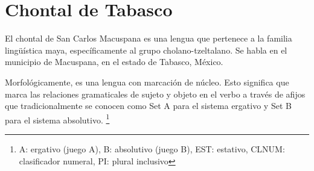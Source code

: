 \section*{Chontal de Tabasco}

\noindent El chontal de San Carlos Macuspana es una lengua que pertenece a la familia lingüística maya, específicamente al grupo cholano-tzeltalano. Se habla en el municipio de Macuspana, en el estado de Tabasco, México.

Morfológicamente, es una lengua con marcación de núcleo. Esto significa que marca las relaciones gramaticales de sujeto y objeto en el verbo a través de afijos que tradicionalmente se conocen como Set A para el sistema ergativo y Set B para el sistema absolutivo.
\footnote{A: ergativo (juego A), B: absolutivo (juego B), EST: estativo, CLNUM: clasificador numeral, PI: plural inclusivo}
\vspace{0.5cm}

